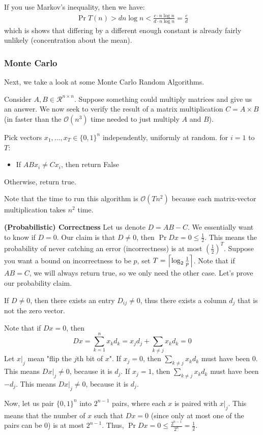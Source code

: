 \begin{algothm}[QuickSort]
    If you use Markov's inequality, then we have:
    \begin{align*}
        \Pr{T(n) > d n \log n} < \frac{c \cdot n \log n}{d \cdot n \log n} = \frac{c}{d}
    \end{align*}
    which is shows that differing by a different enough constant is already fairly unlikely (concentration about the mean).
\end{algothm}

\subsubsection{Monte Carlo}
Next, we take a look at some Monte Carlo Random Algorithms.

Consider $A, B \in \mathcal{R}^{n \times n}$. Suppose something could multiply matrices and give us an answer.
We now seek to verify the result of a matrix multiplication $C = A \times B$ (in faster than the $\mathcal{O}(n^3)$ time needed to just multiply $A$ and $B$).

\begin{algothm}
    Pick vectors $x_1, \dots, x_T \in \{0, 1\}^n$ independently, uniformly at random.
    for $i = 1$ to $T$:
    \begin{itemize}
        \item If $AB x_i \neq C x_i$, then return False
    \end{itemize}
    Otherwise, return true.

    Note that the time to run this algorithm is $\mathcal{O}(Tn^2)$ because each matrix-vector multiplication takes $n^2$ time.

    \textbf{(Probabilistic) Correctness}
    Let us denote $D = AB - C$. We essentially want to know if $D = 0$. Our claim is that $D \neq 0$, then $\Pr{Dx = 0} \leq \frac12$. This means the probability of never catching an error (incorrectness)
    is at most $(\frac12)^T$. Suppose you want a bound on incorrectness to be $p$, set $T = \left\lceil \log_2 \frac{1}{p} \right\rceil$. Note that if $AB = C$, we will always return true, so we only need the other case.
    Let's prove our probability claim.

    If $D \neq 0$, then there exists an entry $D_{ij} \neq 0$, thus there exists a column $d_j$ that is not the zero vector.
   
    Note that if $Dx = 0$, then
    \[ Dx = \sum_{k = 1}^n x_k d_k = x_j d_j + \sum_{k \neq j} x_k d_k = 0 \]
    Let $x\Bigr|_{j}$ mean "flip the $j$th bit of $x$".
    If $x_j = 0$, then $\sum_{k \neq j} x_k d_k$ must have been 0. This means $Dx \Bigr|_{j} \neq 0$, because it is $d_j$. 
    If $x_j = 1$, then $\sum_{k \neq j} x_k d_k$ must have been $-d_j$. This means $Dx \Bigr|_{j} \neq 0$, because it is $d_j$.

    Now, let us pair $\{0, 1\}^n$ into $2^{n - 1}$ pairs, where each $x$ is paired with $x \Bigr|_{j}$. This means that the number of $x$ such that $Dx = 0$ (since only at most one of the pairs can be 0)
    is at most $2^{n - 1}$. Thus, $\Pr{Dx = 0} \leq \frac{2^{n - 1}}{2^n} = \frac12$.
\end{algothm}

